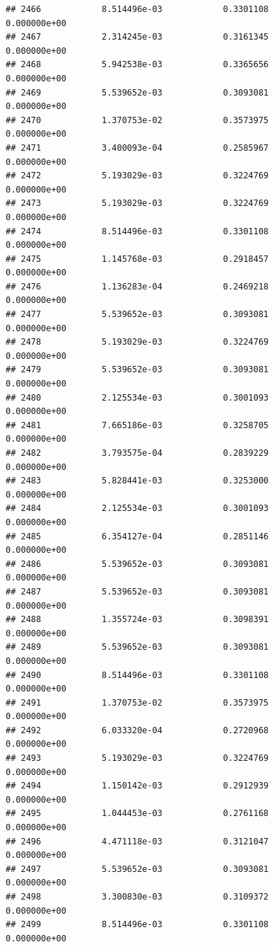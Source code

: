 \documentclass[
]{article}
\begin{document}
\begin{verbatim}
## 2466            8.514496e-03            0.3301108            0.000000e+00
## 2467            2.314245e-03            0.3161345            0.000000e+00
## 2468            5.942538e-03            0.3365656            0.000000e+00
## 2469            5.539652e-03            0.3093081            0.000000e+00
## 2470            1.370753e-02            0.3573975            0.000000e+00
## 2471            3.400093e-04            0.2585967            0.000000e+00
## 2472            5.193029e-03            0.3224769            0.000000e+00
## 2473            5.193029e-03            0.3224769            0.000000e+00
## 2474            8.514496e-03            0.3301108            0.000000e+00
## 2475            1.145768e-03            0.2918457            0.000000e+00
## 2476            1.136283e-04            0.2469218            0.000000e+00
## 2477            5.539652e-03            0.3093081            0.000000e+00
## 2478            5.193029e-03            0.3224769            0.000000e+00
## 2479            5.539652e-03            0.3093081            0.000000e+00
## 2480            2.125534e-03            0.3001093            0.000000e+00
## 2481            7.665186e-03            0.3258705            0.000000e+00
## 2482            3.793575e-04            0.2839229            0.000000e+00
## 2483            5.828441e-03            0.3253000            0.000000e+00
## 2484            2.125534e-03            0.3001093            0.000000e+00
## 2485            6.354127e-04            0.2851146            0.000000e+00
## 2486            5.539652e-03            0.3093081            0.000000e+00
## 2487            5.539652e-03            0.3093081            0.000000e+00
## 2488            1.355724e-03            0.3098391            0.000000e+00
## 2489            5.539652e-03            0.3093081            0.000000e+00
## 2490            8.514496e-03            0.3301108            0.000000e+00
## 2491            1.370753e-02            0.3573975            0.000000e+00
## 2492            6.033320e-04            0.2720968            0.000000e+00
## 2493            5.193029e-03            0.3224769            0.000000e+00
## 2494            1.150142e-03            0.2912939            0.000000e+00
## 2495            1.044453e-03            0.2761168            0.000000e+00
## 2496            4.471118e-03            0.3121047            0.000000e+00
## 2497            5.539652e-03            0.3093081            0.000000e+00
## 2498            3.300830e-03            0.3109372            0.000000e+00
## 2499            8.514496e-03            0.3301108            0.000000e+00

\end{verbatim}
\end{document}
